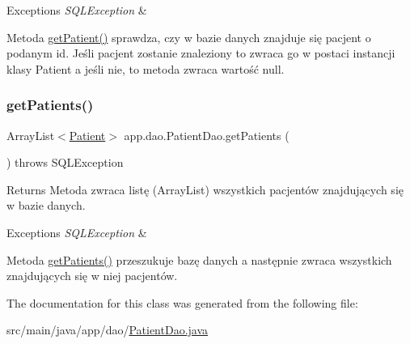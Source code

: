 \begin{DoxyExceptions}{Exceptions}
{\em S\+Q\+L\+Exception} & \\
\hline
\end{DoxyExceptions}
Metoda \mbox{\hyperlink{classapp_1_1dao_1_1_patient_dao_a40b301232820084e66abe4e3de61784e}{get\+Patient()}} sprawdza, czy w bazie danych znajduje się pacjent o podanym id. Jeśli pacjent zostanie znaleziony to zwraca go w postaci instancji klasy Patient a jeśli nie, to metoda zwraca wartość null. \mbox{\label{classapp_1_1dao_1_1_patient_dao_ad5669e99f35b72e402e3ef014b3ae112}} 
\subsubsection{\texorpdfstring{getPatients()}{getPatients()}}
{\footnotesize\ttfamily Array\+List$<$\mbox{\hyperlink{classapp_1_1entity_1_1_patient}{Patient}}$>$ app.\+dao.\+Patient\+Dao.\+get\+Patients (\begin{DoxyParamCaption}{ }\end{DoxyParamCaption}) throws S\+Q\+L\+Exception}

\begin{DoxyReturn}{Returns}
Metoda zwraca listę (Array\+List) wszystkich pacjentów znajdujących się w bazie danych. 
\end{DoxyReturn}

\begin{DoxyExceptions}{Exceptions}
{\em S\+Q\+L\+Exception} & \\
\hline
\end{DoxyExceptions}
Metoda \mbox{\hyperlink{classapp_1_1dao_1_1_patient_dao_ad5669e99f35b72e402e3ef014b3ae112}{get\+Patients()}} przeszukuje bazę danych a następnie zwraca wszystkich znajdujących się w niej pacjentów. 

The documentation for this class was generated from the following file\+:\begin{DoxyCompactItemize}
\item 
src/main/java/app/dao/\mbox{\hyperlink{_patient_dao_8java}{Patient\+Dao.\+java}}\end{DoxyCompactItemize}
